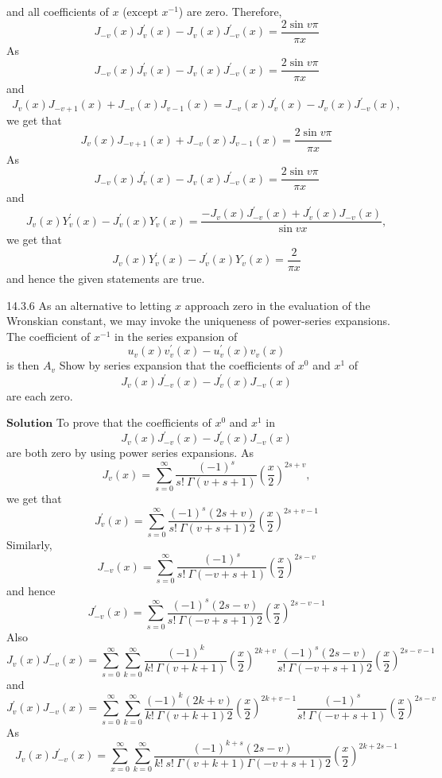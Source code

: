 and all coefficients of $x$ (except $x^{-1}$) are zero. Therefore, 
$$J_{-v}(x) J_{v}^{\prime}(x)-J_{v}(x) J_{-v}^{\prime}(x)=\frac{2 \sin v \pi}{\pi x}$$
As 
$$J_{-v}(x) J_{v}^{\prime}(x)-J_{v}(x) J_{-v}^{\prime}(x)=\frac{2 \sin v \pi}{\pi x}$$ 
and
$$J_{v}(x) J_{-v+1}(x)+J_{-v}(x) J_{v-1}(x)=J_{-v}(x) J_{v}^{\prime}(x)-J_{v}(x) J_{-v}^{\prime}(x),$$ 
we get that
$$J_{v}(x) J_{-v+1}(x)+J_{-v}(x) J_{v-1}(x)=\frac{2 \sin v \pi}{\pi x}$$
As 
$$J_{-v}(x) J_{v}^{\prime}(x)-J_{v}(x) J_{-v}^{\prime}(x)=\frac{2 \sin v \pi}{\pi x}$$ 
and
$$J_{v}(x) Y_{v}^{\prime}(x)-J_{v}^{\prime}(x) Y_{v}(x)=\frac{-J_{v}(x) J_{-v}^{\prime}(x)+J_{v}^{\prime}(x) J_{-v}(x)}{\sin v x},$$ 
we get that
$$J_{v}(x) Y_{v}^{\prime}(x)-J_{v}^{\prime}(x) Y_{v}(x)=\frac{2}{\pi x}$$ 
and hence the given statements are true.
\newpage


\begin{mybox}{14.3.6}
As an alternative to letting $x$ approach zero in the evaluation of the Wronskian constant, we may invoke the uniqueness of power-series expansions. The coefficient of $x^{-1}$ in the series expansion of 
$$u_{v}(x) v_{v}^{\prime}(x)-u_{v}^{\prime}(x) v_{v}(x)$$ is then $A_{v}$  
Show by series expansion that the coefficients of $x^{0}$ and $x^{1}$ of 
$$J_{v}(x) J_{-v}^{\prime}(x)-J_{v}^{\prime}(x) J_{-v}(x)$$ 
are each zero.
\end{mybox}
$\boxed{\textbf{Solution}}$ To prove that the coefficients of $x^{0}$ and $x^{1}$ in 
$$J_{v}(x) J_{-v}^{\prime}(x)-J_{v}^{\prime}(x) J_{-v}(x)$$ 
are both zero by using power series expansions. As 
$$J_{v}(x)=\sum_{s=0}^{\infty} \frac{(-1)^{s}}{s ! \  \Gamma(v+s+1)}\left(\frac{x}{2}\right)^{2 s+v},$$
we get that 
$$J_{v}^{\prime}(x)=\sum_{s=0}^{\infty} \frac{(-1)^{s}(2 s+v)}{s ! \  \Gamma(v+s+1) 2}\left(\frac{x}{2}\right)^{2 s+v-1}$$
Similarly, 
$$J_{-v}(x)=\sum_{s=0}^{\infty} \frac{(-1)^{s}}{s ! \  \Gamma(-v+s+1)}\left(\frac{x}{2}\right)^{2 s-v}$$
and hence
$$J_{-v}^{\prime}(x)=\sum_{s=0}^{\infty} \frac{(-1)^{s}(2 s-v)}{s ! \  \Gamma(-v+s+1) 2}\left(\frac{x}{2}\right)^{2 s-v-1}$$
Also 
$$J_{v}(x) J_{-v}^{\prime}(x)=\sum_{s=0}^{\infty} \sum_{k=0}^{\infty} \frac{(-1)^{k}}{k ! \  \Gamma(v+k+1)}\left(\frac{x}{2}\right)^{2 k+v} \frac{(-1)^{s}(2 s-v)}{s ! \  \Gamma(-v+s+1) 2}\left(\frac{x}{2}\right)^{2 s-v-1}$$ 
and
$$J_{v}^{\prime}(x) J_{-v}(x)=\sum_{s=0}^{\infty} \sum_{k=0}^{\infty} \frac{(-1)^{k}(2 k+v)}{k ! \  \Gamma(v+k+1) 2}\left(\frac{x}{2}\right)^{2 k+v-1} \frac{(-1)^{s}}{s ! \  \Gamma(-v+s+1)}\left(\frac{x}{2}\right)^{2 s-v}$$
As 
$$J_{v}(x) J_{-v}^{\prime}(x)=\sum_{x=0}^{\infty} \sum_{k=0}^{\infty} \frac{(-1)^{k+s}(2 s-v)}{k ! \  s ! \  \Gamma(v+k+1) \Gamma(-v+s+1) 2}\left(\frac{x}{2}\right)^{2 k+2 s-1}$$ 
